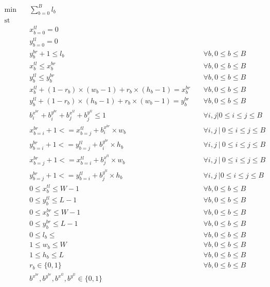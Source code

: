 \documentclass[12pt, a4paper]{article}
\DeclareMathOperator*{\st}{st}
\begin{document}
\begin{subequations}
\begin{align}
  \min \quad & \sum_{b=0}^B l_b \\\label{eq:0}
 \st  \quad & \\
 \quad & x_{b=0}^{tl} = 0 \\\label{c:1}
 \quad & y_{b=0}^{tl} = 0 \\\label{c:2}
 \quad & y_b^{br} + 1 \leq l_b \quad & \forall b, 0 \leq b \leq B \\\label{c:3}
 \quad & x_b^{tl} \leq x_b^{br} \quad & \forall b, 0 \leq b \leq B \\\label{c:4}
 \quad & y_b^{tl} \leq y_b^{br} \quad & \forall b, 0 \leq b \leq B \\\label{c:5}
 \quad & x_b^{tl} + (1-r_b) \times (w_b - 1) + r_b \times (h_b-1) = x_b^{br} \quad & \forall b, 0 \leq b \leq B \\\label{c:6}
 \quad & y_b^{tl} + (1-r_b) \times (h_b - 1) + r_b \times (w_b-1) = y_b^{br} \quad & \forall b, 0 \leq b \leq B \\\label{c:7}
 \quad & b_i^{x^{br}} + b_i^{y^{br}} + b_j^{x^{tl}} + b_j^{y^{tl}} \leq 1 \quad & \forall i,j | 0 \leq i \leq j \leq B \\\label{c:8}
 \quad & x_{b=i}^{br} + 1 <= x_{b=j}^{tl} + b_i^{x^{br}} \times w_b \quad & \forall i,j\ |\ 0 \leq i \leq j \leq B \\\label{c:9}
 \quad & y_{b=i}^{br} + 1 <= y_{b=j}^{tl} + b_i^{y^{br}} \times h_b \quad & \forall i,j\ |\ 0 \leq i \leq j \leq B \\\label{c:10}
 \quad & x_{b=j}^{br} + 1 <= x_{b=i}^{tl} + b_j^{x^{tl}} \times w_b \quad & \forall i,j\ |\ 0 \leq i \leq j \leq B \\\label{c:11}
 \quad & y_{b=j}^{br} + 1 <= y_{b=i}^{tl} + b_j^{y^{tl}} \times h_b \quad & \forall i,j\ | 0 \leq i \leq j \leq B \\\label{c:12}
 \quad & 0 \leq x_b^{tl} \leq W-1 \quad & \forall b, 0 \leq b \leq B \\\label{b:1}
 \quad & 0 \leq y_b^{tl} \leq L-1 \quad & \forall b, 0 \leq b \leq B \\\label{b:2}
 \quad & 0 \leq x_b^{br} \leq W-1 \quad & \forall b, 0 \leq b \leq B \\\label{b:3}
 \quad & 0 \leq y_b^{br} \leq L-1 \quad & \forall b, 0 \leq b \leq B \\\label{b:4}
 \quad & 0 \leq l_b \leq \quad & \forall b, 0 \leq b \leq B \\\label{b:5}
 \quad & 1 \leq w_b \leq W \quad & \forall b, 0 \leq b \leq B \\\label{b:6}
 \quad & 1 \leq h_b \leq L \quad & \forall b, 0 \leq b \leq B \\\label{b:7}
 \quad & r_b \in \{0,1\} \quad & \forall b, 0 \leq b \leq B \\\label{b:8}
 \quad & b^{x^{br}}, b^{y^{br}}, b^{x^{tl}}, b^{y^{tl}} \in \{0,1\} \\\label{b:9}
\end{align}
\end{subequations}
\end{document}
